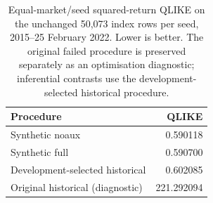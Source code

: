 \begin{table}[!htbp]\centering\small
\caption[Stronger historical comparator]{Equal-market/seed squared-return QLIKE on the unchanged 50,073 index rows per seed, 2015--25 February 2022. Lower is better. The original failed procedure is preserved separately as an optimisation diagnostic; inferential contrasts use the development-selected historical procedure.}
\label{tab:followup-historical}
\begin{tabular}{lr}
\toprule
Procedure & QLIKE \\
\midrule
Synthetic noaux & 0.590118 \\
Synthetic full & 0.590700 \\
Development-selected historical & 0.602085 \\
Original historical (diagnostic) & 221.292094 \\
\bottomrule\end{tabular}
\end{table}
